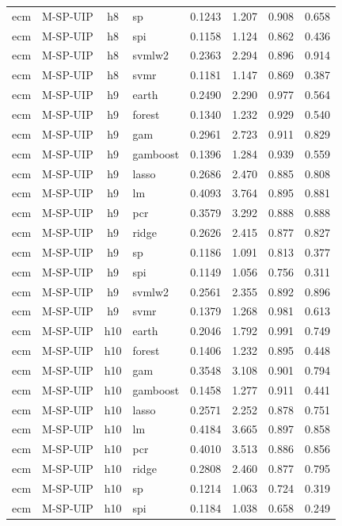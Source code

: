 \begin{ThreePartTable}
\begin{longtable}[t]{llclcccc}
ecm & M-SP-UIP & h8 & sp & 0.1243 & 1.207 & 0.908 & 0.658\\
ecm & M-SP-UIP & h8 & spi & 0.1158 & 1.124 & 0.862 & 0.436\\
ecm & M-SP-UIP & h8 & svmlw2 & 0.2363 & 2.294 & 0.896 & 0.914\\
ecm & M-SP-UIP & h8 & svmr & 0.1181 & 1.147 & 0.869 & 0.387\\
\addlinespace
ecm & M-SP-UIP & h9 & earth & 0.2490 & 2.290 & 0.977 & 0.564\\
ecm & M-SP-UIP & h9 & forest & 0.1340 & 1.232 & 0.929 & 0.540\\
ecm & M-SP-UIP & h9 & gam & 0.2961 & 2.723 & 0.911 & 0.829\\
ecm & M-SP-UIP & h9 & gamboost & 0.1396 & 1.284 & 0.939 & 0.559\\
ecm & M-SP-UIP & h9 & lasso & 0.2686 & 2.470 & 0.885 & 0.808\\
ecm & M-SP-UIP & h9 & lm & 0.4093 & 3.764 & 0.895 & 0.881\\
ecm & M-SP-UIP & h9 & pcr & 0.3579 & 3.292 & 0.888 & 0.888\\
ecm & M-SP-UIP & h9 & ridge & 0.2626 & 2.415 & 0.877 & 0.827\\
ecm & M-SP-UIP & h9 & sp & 0.1186 & 1.091 & 0.813 & 0.377\\
ecm & M-SP-UIP & h9 & spi & 0.1149 & 1.056 & 0.756 & 0.311\\
ecm & M-SP-UIP & h9 & svmlw2 & 0.2561 & 2.355 & 0.892 & 0.896\\
ecm & M-SP-UIP & h9 & svmr & 0.1379 & 1.268 & 0.981 & 0.613\\
\addlinespace
ecm & M-SP-UIP & h10 & earth & 0.2046 & 1.792 & 0.991 & 0.749\\
ecm & M-SP-UIP & h10 & forest & 0.1406 & 1.232 & 0.895 & 0.448\\
ecm & M-SP-UIP & h10 & gam & 0.3548 & 3.108 & 0.901 & 0.794\\
ecm & M-SP-UIP & h10 & gamboost & 0.1458 & 1.277 & 0.911 & 0.441\\
ecm & M-SP-UIP & h10 & lasso & 0.2571 & 2.252 & 0.878 & 0.751\\
ecm & M-SP-UIP & h10 & lm & 0.4184 & 3.665 & 0.897 & 0.858\\
ecm & M-SP-UIP & h10 & pcr & 0.4010 & 3.513 & 0.886 & 0.856\\
ecm & M-SP-UIP & h10 & ridge & 0.2808 & 2.460 & 0.877 & 0.795\\
ecm & M-SP-UIP & h10 & sp & 0.1214 & 1.063 & 0.724 & 0.319\\
ecm & M-SP-UIP & h10 & spi & 0.1184 & 1.038 & 0.658 & 0.249\\

\end{longtable}
\end{ThreePartTable}
